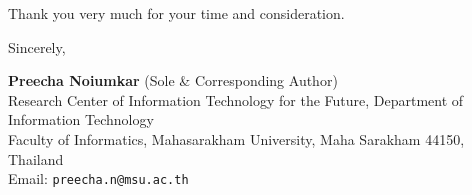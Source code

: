 \documentclass[11pt,a4paper]{article}
\begin{document}
Thank you very much for your time and consideration.

\vspace{1.2em}
\noindent Sincerely,

\vspace{1.5em}
\noindent
\textbf{Preecha Noiumkar} (Sole \& Corresponding Author)\\
Research Center of Information Technology for the Future, Department of Information Technology\\
Faculty of Informatics, Mahasarakham University, Maha Sarakham 44150, Thailand\\
Email: \texttt{preecha.n@msu.ac.th}
\end{document}
